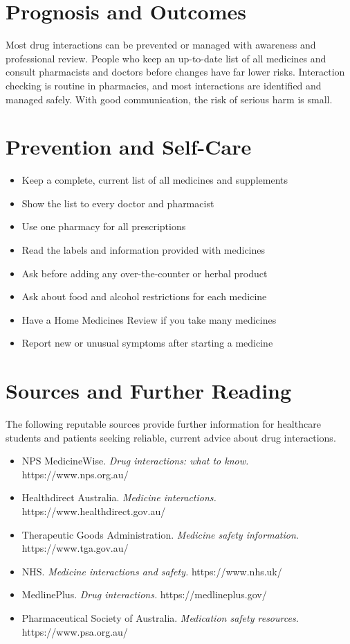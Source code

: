 \section*{Prognosis and Outcomes}
Most drug interactions can be prevented or managed with awareness and professional review. People who keep an up-to-date list of all medicines and consult pharmacists and doctors before changes have far lower risks. Interaction checking is routine in pharmacies, and most interactions are identified and managed safely. With good communication, the risk of serious harm is small.

\section*{Prevention and Self-Care}
\begin{itemize}
    \item Keep a complete, current list of all medicines and supplements
    \item Show the list to every doctor and pharmacist
    \item Use one pharmacy for all prescriptions
    \item Read the labels and information provided with medicines
    \item Ask before adding any over-the-counter or herbal product
    \item Ask about food and alcohol restrictions for each medicine
    \item Have a Home Medicines Review if you take many medicines
    \item Report new or unusual symptoms after starting a medicine
\end{itemize}

\section*{Sources and Further Reading}
The following reputable sources provide further information for healthcare students and patients seeking reliable, current advice about drug interactions.

\begin{itemize}
    \item NPS MedicineWise. \textit{Drug interactions: what to know.} https://www.nps.org.au/
    \item Healthdirect Australia. \textit{Medicine interactions.} https://www.healthdirect.gov.au/
    \item Therapeutic Goods Administration. \textit{Medicine safety information.} https://www.tga.gov.au/
    \item NHS. \textit{Medicine interactions and safety.} https://www.nhs.uk/
    \item MedlinePlus. \textit{Drug interactions.} https://medlineplus.gov/
    \item Pharmaceutical Society of Australia. \textit{Medication safety resources.} https://www.psa.org.au/
\end{itemize}

